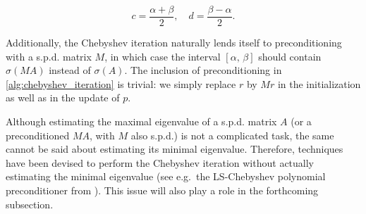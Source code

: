 \documentclass[a4paper]{article}
\theoremstyle{plain}
\theoremstyle{definition}
\theoremstyle{remark}
\begin{document}
\begin{algorithm}[!htb]
	\caption{Chebyshev iteration of degree \(k\)}\label{alg:chebyshev_iteration}
	\begin{algorithmic}[1]
		
		\vspace{1em}
		
		\begin{equation*}
			c = \frac{\alpha + \beta}{2}, \quad d = \frac{\beta - \alpha}{2}.
		\end{equation*}
		
		
		\vspace{1em}
		
		
		\vspace{1em}
		
		
		
		\vspace{1em}
		
		
		\EndFor
		
		\vspace{1em}
		
	\end{algorithmic}
\end{algorithm}

Additionally, the Chebyshev iteration naturally lends itself to preconditioning with a s.p.d. matrix \(M\), in which case the interval \([\alpha,\, \beta]\) should contain \(\sigma(MA)\) instead of \(\sigma(A)\). The inclusion of preconditioning in \cref{alg:chebyshev_iteration} is trivial: we simply replace \(r\) by \(Mr\) in the initialization as well as in the update of \(p\).

Although estimating the maximal eigenvalue of a s.p.d. matrix \(A\) (or a preconditioned \(MA\), with \(M\) also s.p.d.) is not a complicated task, the same cannot be said about estimating its minimal eigenvalue. Therefore, techniques have been devised to perform the Chebyshev iteration without actually estimating the minimal eigenvalue (see e.g.\ the LS-Chebyshev polynomial preconditioner from \cite{Ashby1992}). This issue will also play a role in the forthcoming subsection.
\end{document}

